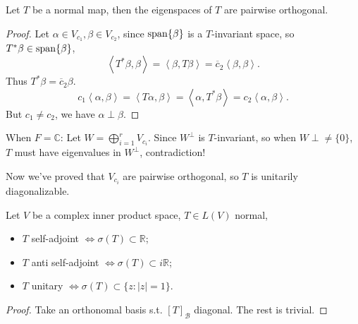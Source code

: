 \begin{proposition}
	Let $T$ be a normal map, then the eigenspaces of $T$ are pairwise orthogonal.
\end{proposition}
\begin{proof}[Proof]
    Let $\alpha\in V_{c_1}, \beta\in V_{c_2}$, since $\operatorname{span}\{\beta\}$ is
	a $T$-invariant space, so $T^*\beta \in \operatorname{span}\{\beta\}$,
	\[
	\left<T^*\beta, \beta \right> = \left<\beta, T\beta \right>
	= \overline{c}_2 \left<\beta, \beta \right>.
	\]
	Thus $T^*\beta = \overline{c}_2 \beta$.
	\[
	c_1\left<\alpha, \beta \right> = \left<T\alpha, \beta \right>
	= \left<\alpha, T^*\beta \right> = c_2 \left<\alpha, \beta \right>.
	\]
	But $c_1\ne c_2$, we have $\alpha\perp\beta$.
\end{proof}

When $F = \mathbb{C}$:
Let $W = \bigoplus_{i = 1}^r V_{c_i}$. Since $W^\perp$ is $T$-invariant,
so when $W\perp \ne \{0\}$, $T$ must have eigenvalues in $W^\perp$, contradiction!

Now we've proved that $V_{c_i}$ are pairwise orthogonal, so $T$ is
unitarily diagonalizable.

\begin{proposition}
	Let $V$ be a complex inner product space, $T\in L(V)$ normal,
	\begin{itemize}
		\item $T$ self-adjoint $\iff \sigma(T) \subset \mathbb{R}$;
		\item $T$ anti self-adjoint $\iff \sigma(T) \subset i \mathbb{R}$;
		\item $T$ unitary $\iff \sigma(T) \subset \{z: |z| = 1\}$.
	\end{itemize}
\end{proposition}
\begin{proof}[Proof]
	Take an orthonomal basis s.t. $[T]_{\mathcal{B}}$ diagonal.
	The rest is trivial.
\end{proof}
